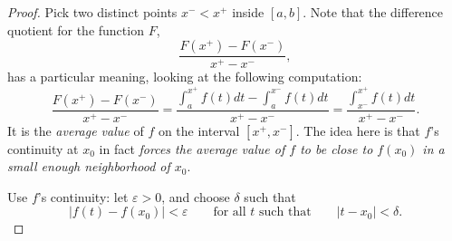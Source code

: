 \documentclass{article}
\begin{document}
\begin{proof}
    Pick two distinct points $x^- < x^+$ inside $[a, b]$. 
    Note that the difference quotient for the function $F$,
    \[
        \frac{F(x^+) - F(x^-)}{x^+-x^-},
    \]
    has a particular meaning, looking at the following computation:
    \[
        \frac{F(x^+) - F(x^-)}{x^+-x^-} = \frac{\displaystyle \int_a^{x^+} f(t)dt - \int_a^{x^-}f(t)dt}{x^+-x^-} = \frac{\displaystyle\int_{x^-}^{x^+} f(t)dt}{x^+-x^-}.
    \]
    It is the \emph{average value} of $f$ on the interval $[x^+, x^-]$. 
    The idea here is that $f$'s continuity at $x_0$ in fact \emph{forces the average value of $f$ to be close to $f(x_0)$ in a small enough neighborhood of $x_0$}. 

    Use $f$'s continuity: let $\varepsilon > 0$, and choose $\delta$ such that
    \[|f(t)-f(x_0)| < \varepsilon \qquad \text{for all }t\text{ such that} \qquad |t-x_0| < \delta.\]


\end{proof}
\end{document}

